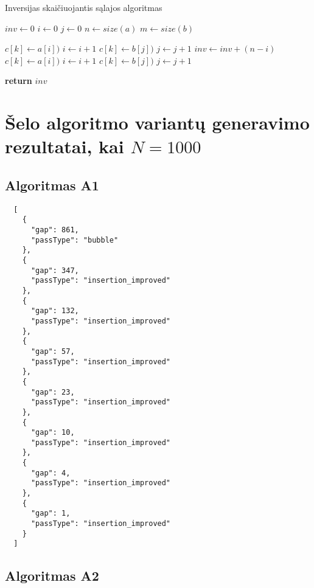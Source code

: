 \documentclass{VUMIFInfKursinis}
\begin{document}
\begin{algorithm}[H]
  \caption{Inversijas skaičiuojantis sąlajos algoritmas}\label{alg:merge}
  \begin{algorithmic}[1]
      \State $inv \gets 0$
      \State $i \gets 0$
      \State $j \gets 0$
      \State $n \gets size(a)$
      \State $m \gets size(b)$
      
              \State $c[k] \gets a[i])$
              \State $i \gets i+1$
            \Else
              \State $c[k] \gets b[j])$
              \State $j \gets j+1$
              \State $inv \gets inv + (n-i)$
            \EndIf
          \Else
            \State $c[k] \gets a[i])$
            \State $i \gets i+1$
          \EndIf
        \Else
          \State $c[k] \gets b[j])$
          \State $j \gets j+1$
        \EndIf
      \EndFor

      \State \textbf{return} $inv$
      
    \EndProcedure
  \end{algorithmic}
\end{algorithm}

\section{Šelo algoritmo variantų generavimo rezultatai, kai $N = 1000$}

\subsection{Algoritmas A1}

\lstset{language=json}
\begin{lstlisting}
  [
    {
      "gap": 861,
      "passType": "bubble"
    },
    {
      "gap": 347,
      "passType": "insertion_improved"
    },
    {
      "gap": 132,
      "passType": "insertion_improved"
    },
    {
      "gap": 57,
      "passType": "insertion_improved"
    },
    {
      "gap": 23,
      "passType": "insertion_improved"
    },
    {
      "gap": 10,
      "passType": "insertion_improved"
    },
    {
      "gap": 4,
      "passType": "insertion_improved"
    },
    {
      "gap": 1,
      "passType": "insertion_improved"
    }
  ]
\end{lstlisting}

\subsection{Algoritmas A2}
\end{document}
